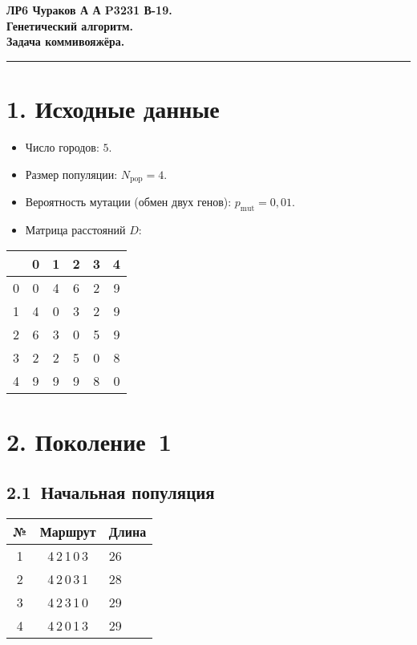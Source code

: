 \documentclass[a4paper,12pt]{article}
\begin{document}
\begin{center}
  \Large\bfseries
  ЛР6 Чураков А А P3231 В-19.\\
  Генетический алгоритм.\\
  Задача коммивояжёра.
\end{center}

\vspace{0.5em}\hrule\vspace{1em}

\section*{1. Исходные данные}

\begin{itemize}
  \item Число городов: $5$.
  \item Размер популяции: $N_{\text{pop}} = 4$.
  \item Вероятность мутации (обмен двух генов): $p_{\text{mut}} = 0{,}01$.
  \item Матрица расстояний $D$:\\[0.3em]
\end{itemize}

\begin{center}
\begin{tabular}{c|ccccc}
\toprule
&0&1&2&3&4\\\midrule
0&0&4&6&2&9\\
1&4&0&3&2&9\\
2&6&3&0&5&9\\
3&2&2&5&0&8\\
4&9&9&9&8&0\\
\bottomrule
\end{tabular}
\end{center}

\section*{2. Поколение 1}

\subsection*{2.1 Начальная популяция}

\begin{center}
\begin{tabular}{ccl}
\toprule
№ & Маршрут & Длина\\\midrule
1 & 4\,2\,1\,0\,3 & 26\\
2 & 4\,2\,0\,3\,1 & 28\\
3 & 4\,2\,3\,1\,0 & 29\\
4 & 4\,2\,0\,1\,3 & 29\\
\bottomrule
\end{tabular}
\end{center}
\end{document}
